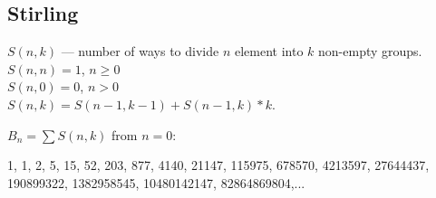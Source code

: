 \subsection{Stirling}

$S(n, k)$ --- number of ways to divide $n$ element into $k$ non-empty groups.\\

$S(n, n) = 1$, $n \ge 0$\\
$S(n, 0) = 0$, $n > 0$\\

$S(n, k) = S(n - 1, k - 1) + S(n - 1, k) * k$.


$B_n = \sum S(n, k)$ from $n = 0$:

1, 1, 2, 5, 15, 52, 203, 877, 4140, 21147, 115975, 678570, 4213597, 27644437, 190899322, 1382958545, 10480142147, 82864869804,...






\
